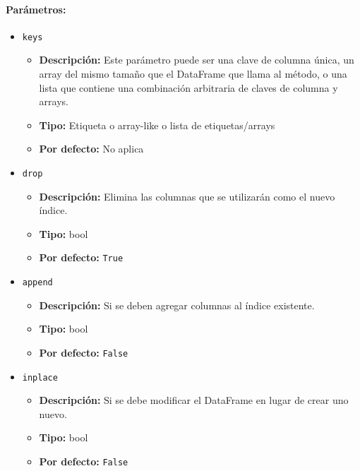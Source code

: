         \paragraph{Parámetros:}
        \begin{itemize}
            \item \texttt{keys}
                \begin{itemize}
                    \item \textbf{Descripción:} Este parámetro puede ser una clave de columna única, un array del mismo tamaño que el DataFrame que llama al método, o una lista que contiene una combinación arbitraria de claves de columna y arrays.
                    \item \textbf{Tipo:} Etiqueta o array-like o lista de etiquetas/arrays
                    \item \textbf{Por defecto:} No aplica
                \end{itemize}

            \item \texttt{drop}
                \begin{itemize}
                    \item \textbf{Descripción:} Elimina las columnas que se utilizarán como el nuevo índice.
                    \item \textbf{Tipo:} bool
                    \item \textbf{Por defecto:} \texttt{True}
                \end{itemize}

            \item \texttt{append}
                \begin{itemize}
                    \item \textbf{Descripción:} Si se deben agregar columnas al índice existente.
                    \item \textbf{Tipo:} bool
                    \item \textbf{Por defecto:} \texttt{False}
                \end{itemize}

            \item \texttt{inplace}
                \begin{itemize}
                    \item \textbf{Descripción:} Si se debe modificar el DataFrame en lugar de crear uno nuevo.
                    \item \textbf{Tipo:} bool
                    \item \textbf{Por defecto:} \texttt{False}
                \end{itemize}


\end{itemize}
